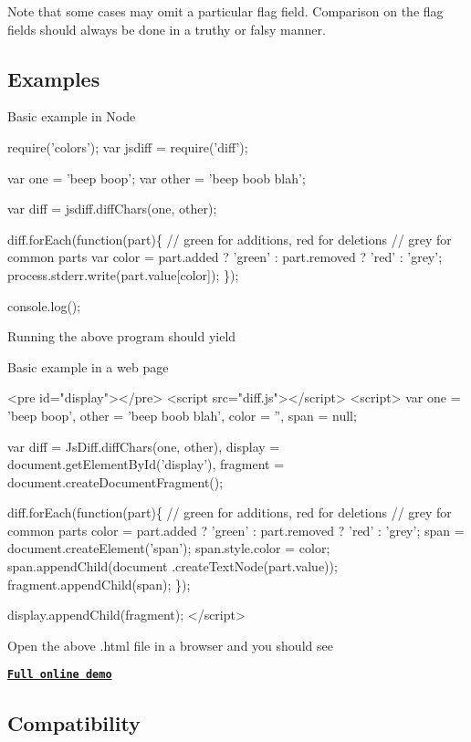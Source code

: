 Note that some cases may omit a particular flag field. Comparison on the flag fields should always be done in a truthy or falsy manner.

\subsection*{Examples}

Basic example in Node


\begin{DoxyCode}
require('colors');
var jsdiff = require('diff');

var one = 'beep boop';
var other = 'beep boob blah';

var diff = jsdiff.diffChars(one, other);

diff.forEach(function(part)\{
  // green for additions, red for deletions
  // grey for common parts
  var color = part.added ? 'green' :
    part.removed ? 'red' : 'grey';
  process.stderr.write(part.value[color]);
\});

console.log();
\end{DoxyCode}
 Running the above program should yield



Basic example in a web page


\begin{DoxyCode}
<pre id="display"></pre>
<script src="diff.js"></script>
<script>
var one = 'beep boop',
    other = 'beep boob blah',
    color = '',
    span = null;

var diff = JsDiff.diffChars(one, other),
    display = document.getElementById('display'),
    fragment = document.createDocumentFragment();

diff.forEach(function(part)\{
  // green for additions, red for deletions
  // grey for common parts
  color = part.added ? 'green' :
    part.removed ? 'red' : 'grey';
  span = document.createElement('span');
  span.style.color = color;
  span.appendChild(document
    .createTextNode(part.value));
  fragment.appendChild(span);
\});

display.appendChild(fragment);
</script>
\end{DoxyCode}


Open the above .html file in a browser and you should see



{\bfseries \href{http://kpdecker.github.com/jsdiff}{\tt Full online demo}}

\subsection*{Compatibility}

